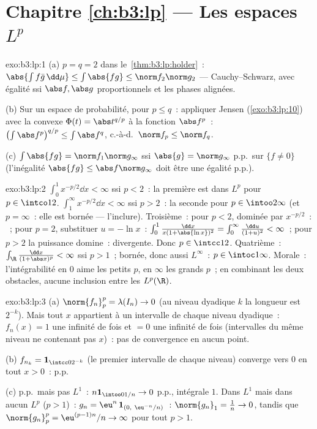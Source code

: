 \section*{Chapitre \ref{ch:b3:lp} --- Les espaces $L^p$}

\begin{solution}{exo:b3:lp:1}
(a) $p = q = 2$ dans le~\cref{thm:b3:lp:holder}~:
$\abs{\int f\bar g\,\dd\mu} \leq \int\abs{fg} \leq \norm
f_2\norm g_2$ --- Cauchy--Schwarz, avec égalité ssi $\abs f,
\abs g$ proportionnels et les phases alignées.

(b) Sur un espace de probabilité, pour $p \leq q$~: appliquer
Jensen (\cref{exo:b3:lp:10}) avec la convexe $\Phi(t) =
\abs t^{q/p}$ à la fonction $\abs f^p$~:
$\bigl(\int\abs f^p\bigr)^{q/p} \leq \int\abs f^q$, c.-à-d.\
$\norm f_p \leq \norm f_q$.

(c) $\int\abs{fg} = \norm f_1\norm g_\infty$ ssi $\abs{g} =
\norm g_\infty$ p.p.\ sur $\{f \neq 0\}$ (l'inégalité
$\abs{fg} \leq \abs f\norm g_\infty$ doit être une égalité
p.p.).
\end{solution}

\begin{solution}{exo:b3:lp:2}
$\int_0^1 x^{-p/2}\dd x < \infty$ ssi $p < 2$~: la première
est dans $L^p$ pour $p \in \intco12$. $\int_1^\infty
x^{-p/2}\dd x < \infty$ ssi $p > 2$~: la seconde pour $p \in
\intoo2\infty$ (et $p = \infty$~: elle est bornée ---
l'inclure). Troisième~: pour $p < 2$, dominée par
$x^{-p/2}$~: ~; pour $p = 2$, substituer $u =
-\ln x$~: $\int_0^1\frac{\dd x}{x(1 + \abs{\ln x})^2} =
\int_0^\infty\frac{\dd u}{(1 + u)^2} < \infty$~; pour $p >
2$ la puissance domine~: divergente. Donc $p \in \intcc12$.
Quatrième~: $\int_\R\frac{\dd x}{(1 + \abs x)^p} < \infty$
ssi $p > 1$~; bornée, donc aussi $L^\infty$~: $p \in
\intoc1\infty$. Morale~: l'intégrabilité en $0$ aime les
petits $p$, en $\infty$ les grands $p$~; en combinant les
deux obstacles, aucune inclusion entre les $L^p(\R)$.
\end{solution}

\begin{solution}{exo:b3:lp:3}
(a) $\norm{f_n}_p^p = \lambda(I_n) \to 0$ (au niveau
dyadique $k$ la longueur est $2^{-k}$). Mais tout $x$
appartient à un intervalle de chaque niveau dyadique~:
$f_n(x) = 1$ une infinité de fois et $= 0$ une infinité de
fois (intervalles du même niveau ne contenant pas $x$)~: pas
de convergence en aucun point.

(b) $f_{n_k} = \mathbf 1_{\intcc0{2^{-k}}}$ (le premier
intervalle de chaque niveau) converge vers $0$ en tout $x >
0$~: p.p.

(c) p.p.\ mais pas $L^1$~: $n\mathbf 1_{\intoo0{1/n}} \to 0$
p.p., intégrale $1$. Dans $L^1$ mais dans aucun $L^p$ ($p >
1$)~: $g_n = \eu^n\,\mathbf 1_{(0,\ \eu^{-n}/n)}$~:
$\norm{g_n}_1 = \frac1n \to 0$, tandis que
$\norm{g_n}_p^p = \eu^{(p-1)n}/n \to \infty$ pour tout $p >
1$.
\end{solution}

